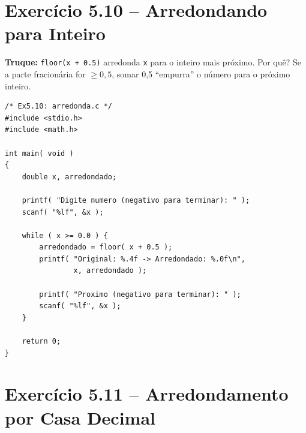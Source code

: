 \documentclass[12pt,a4paper]{article}
\begin{document}
\newpage

\section{Exercício 5.10 -- Arredondando para Inteiro}

\begin{respostabox}
\textbf{Truque:} \texttt{floor(x + 0.5)} arredonda \texttt{x} para o inteiro mais
próximo. Por quê? Se a parte fracionária for $\geq 0{,}5$, somar 0{,}5 ``empurra''
o número para o próximo inteiro.

\begin{lstlisting}
/* Ex5.10: arredonda.c */
#include <stdio.h>
#include <math.h>

int main( void )
{
    double x, arredondado;

    printf( "Digite numero (negativo para terminar): " );
    scanf( "%lf", &x );

    while ( x >= 0.0 ) {
        arredondado = floor( x + 0.5 );
        printf( "Original: %.4f -> Arredondado: %.0f\n",
                x, arredondado );

        printf( "Proximo (negativo para terminar): " );
        scanf( "%lf", &x );
    }

    return 0;
}
\end{lstlisting}
\end{respostabox}

\section{Exercício 5.11 -- Arredondamento por Casa Decimal}
\end{document}
